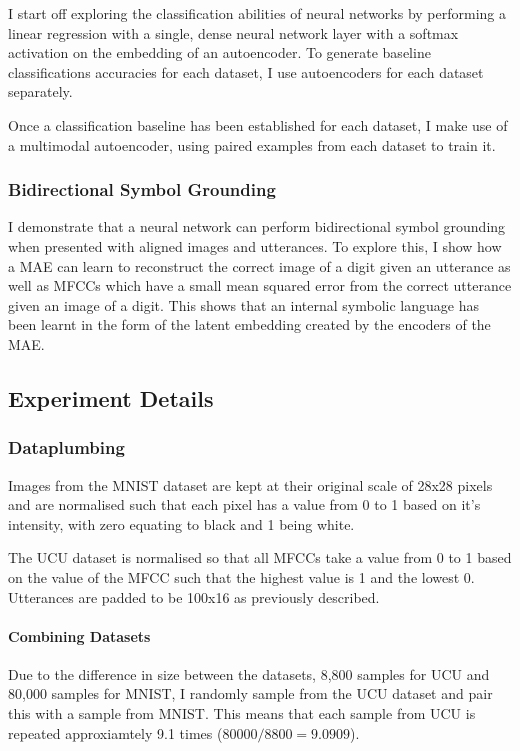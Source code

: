 I start off exploring the classification abilities of neural networks by performing a linear regression with a single, dense neural network layer with a softmax activation on the embedding of an autoencoder. To generate baseline classifications accuracies for each dataset, I use autoencoders for each dataset separately.

Once a classification baseline has been established for each dataset, I make use of a multimodal autoencoder, using paired examples from each dataset to train it.

\subsubsection{Bidirectional Symbol Grounding}

I demonstrate that a neural network can perform bidirectional symbol grounding \cite{barsalou2008grounded} when presented with aligned images and utterances. To explore this, I show how a MAE can learn to reconstruct the correct image of a digit given an utterance as well as MFCCs which have a small mean squared error from the correct utterance given an image of a digit. This shows that an internal symbolic language has been learnt in the form of the latent embedding created by the encoders of the MAE.


\subsection{Experiment Details}
\subsubsection{Dataplumbing}
Images from the MNIST dataset are kept at their original scale of 28x28 pixels and are normalised such that each pixel has a value from 0 to 1 based on it's intensity, with zero equating to black and 1 being white.

The UCU dataset is normalised so that all MFCCs take a value from 0 to 1 based on the value of the MFCC such that the highest value is 1 and the lowest 0. Utterances are padded to be 100x16 as previously described.

\paragraph{Combining Datasets}
\label{sec:UCU_mnist_comb}
Due to the difference in size between the datasets, 8,800 samples for UCU and 80,000 samples for MNIST, I randomly sample from the UCU dataset and pair this with a sample from MNIST. This means that each sample from UCU is repeated approxiamtely 9.1 times ($80000/8800=9.0909$).


